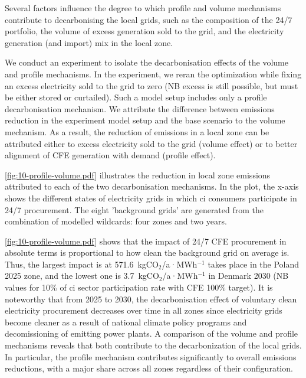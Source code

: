 \documentclass[11pt, 5p, nopreprintline]{elsarticle}
\begin{document}
Several factors influence the degree to which profile and volume mechanisms contribute to decarbonising the local grids, such as the composition of the 24/7 portfolio, the volume of excess generation sold to the grid, and the electricity generation (and import) mix in the local zone.

We conduct an experiment to isolate the decarbonisation effects of the volume and profile mechanisms.
In the experiment, we reran the optimization while fixing an excess electricity sold to the grid to zero (NB excess is still possible, but must be either stored or curtailed).
Such a model setup includes only a profile decarbonisation mechanism.
We attribute the difference between emissions reduction in the experiment model setup and the base scenario to the volume mechanism.
As a result, the reduction of emissions in a local zone can be attributed either to excess electricity sold to the grid (volume effect) or to better alignment of CFE generation with demand (profile effect).

\cref{fig:10-profile-volume.pdf} illustrates the reduction in local zone emissions attributed to each of the two decarbonisation mechanisms.
In the plot, the x-axis shows the different states of electricity grids in which \gls{ci} consumers participate in 24/7 procurement.
The eight 'background grids' are generated from the combination of modelled wildcards: four zones and two years.

\cref{fig:10-profile-volume.pdf} shows that the impact of 24/7 CFE procurement in absolute terms is proportional to how clean the background grid on average is.
Thus, the largest impact is at 571.6~kgCO$_2$/a·MWh$^{-1}$ takes place in the Poland 2025 zone, and the lowest one is 3.7~kgCO$_2$/a·MWh$^{-1}$ in Denmark 2030 (NB values for 10\% of \gls{ci} sector participation rate with CFE 100\% target).
It is noteworthy that from 2025 to 2030, the decarbonisation effect of voluntary clean electricity procurement decreases over time in all zones since electricity grids become cleaner as a result of national climate policy programs and decomissioning of emitting power plants.
A comparison of the volume and profile mechanisms reveals that both contribute to the decarbonization of the local grids.
In particular, the profile mechanism contributes significantly to overall emissions reductions, with a major share across all zones regardless of their configuration.
\end{document}
